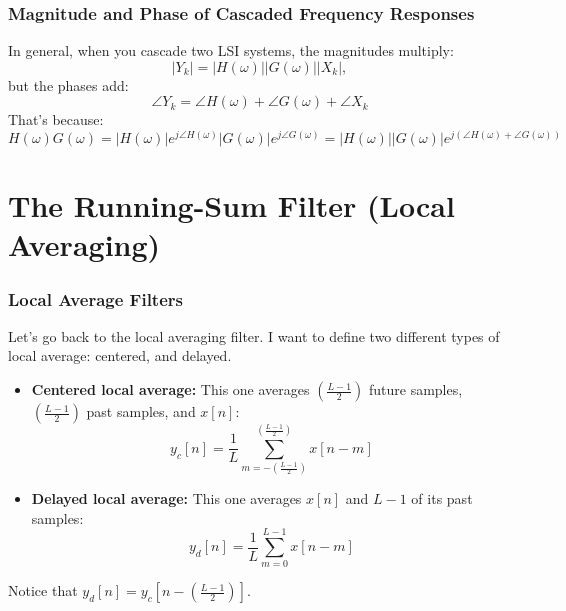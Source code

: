 \documentclass{beamer}
\begin{document}
\begin{frame}
  \frametitle{Magnitude and Phase of Cascaded Frequency Responses}

  In general, when you cascade two LSI systems, the magnitudes multiply:
  \[
  |Y_k|=|H(\omega)||G(\omega)||X_k|,
  \]
  but the phases add:
  \[
  \angle Y_k = \angle H(\omega)+\angle G(\omega)+\angle X_k
  \]
  That's because:
  \[
  H(\omega)G(\omega)=|H(\omega)|e^{j\angle H(\omega)}|G(\omega)|e^{j\angle G(\omega)}
  =|H(\omega)||G(\omega)| e^{j\left(\angle H(\omega)+\angle G(\omega)\right)}
  \]
\end{frame}


\section[Sum]{The Running-Sum Filter (Local Averaging)}
\setcounter{subsection}{1}

\begin{frame}
  \frametitle{Local Average Filters}

  Let's go back to the local averaging filter. I want to define two 
  different types of local average: centered, and delayed.
  \begin{itemize}
  \item {\bf Centered local average:} This one averages
    $\left(\frac{L-1}{2}\right)$ future samples,
    $\left(\frac{L-1}{2}\right)$ past samples, and $x[n]$:
    \[
    y_c[n] = \frac{1}{L}\sum_{m=-\left(\frac{L-1}{2}\right)}^{\left(\frac{L-1}{2}\right)} x[n-m]
    \]
  \item {\bf Delayed local average:} This one averages $x[n]$ and $L-1$ of its
    past samples:
    \[
    y_d[n] = \frac{1}{L}\sum_{m=0}^{L-1} x[n-m]
    \]
  \end{itemize}
  Notice that $y_d[n] = y_c\left[n-\left(\frac{L-1}{2}\right)\right]$.
\end{frame}
\end{document}
